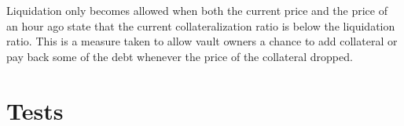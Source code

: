 \documentclass{article} %
\begin{document}
Liquidation only becomes allowed when both the current price and the price of an
hour ago state that the current collateralization ratio is below the liquidation
ratio.
This is a measure taken to allow vault owners a chance to add collateral or pay
back some of the debt whenever the price of the collateral dropped.

\section{Tests}


% 
\end{document}
